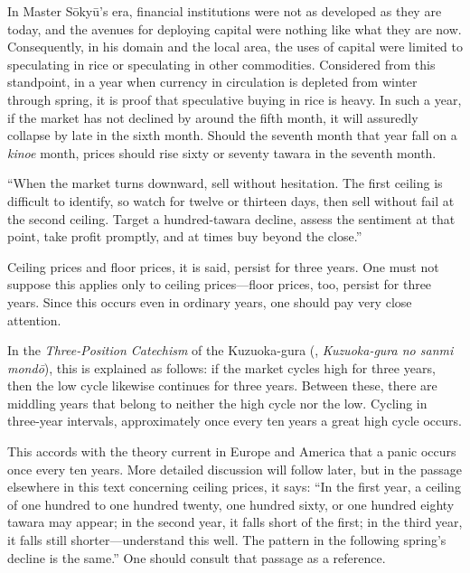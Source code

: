 \commentary
In Master S\=oky\=u's era, financial institutions were not as developed
as they are today, and the avenues for deploying capital were nothing
like what they are now. Consequently, in his domain and the local area,
the uses of capital were limited to speculating in rice or speculating in
other commodities. Considered from this standpoint, in a year when
currency in circulation is depleted from winter through spring, it is
proof that speculative buying in rice is heavy. In such a year, if the
market has not declined by around the fifth month, it will assuredly
collapse by late in the sixth month. Should the seventh month that year
fall on a \textit{kinoe} month, prices should rise sixty or seventy
tawara in the seventh month.

``When the market turns downward, sell without hesitation. The first
ceiling is difficult to identify, so watch for twelve or thirteen days,
then sell without fail at the second ceiling. Target a hundred-tawara
decline, assess the sentiment at that point, take profit promptly, and
at times buy beyond the close.''


\begin{sokyubox}
{\small\itshape\color{sokyubar} }

\medskip
Ceiling prices and floor prices, it is said, persist for three years.
One must not suppose this applies only to ceiling prices---floor prices,
too, persist for three years. Since this occurs even in ordinary years,
one should pay very close attention.
\end{sokyubox}

\commentary
In the \textit{Three-Position Catechism} of the Kuzuoka-gura
(, \textit{Kuzuoka-gura no sanmi mond\=o}), this
is explained as follows: if the market cycles high for three years, then
the low cycle likewise continues for three years. Between these, there
are middling years that belong to neither the high cycle nor the low.
Cycling in three-year intervals, approximately once every ten years a
great high cycle occurs.

This accords with the theory current in Europe and America that a panic
occurs once every ten years. More detailed discussion will follow later,
but in the passage elsewhere in this text concerning ceiling prices, it
says: ``In the first year, a ceiling of one hundred to one hundred
twenty, one hundred sixty, or one hundred eighty tawara may appear; in
the second year, it falls short of the first; in the third year, it
falls still shorter---understand this well. The pattern in the following
spring's decline is the same.'' One should consult that passage as a
reference.

